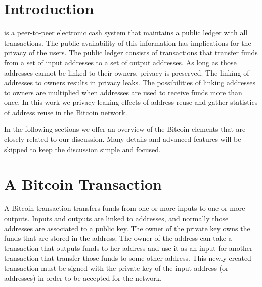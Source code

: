 \documentclass[journal]{IEEEtran}
\begin{document}
\section{Introduction}
%
%
%
%



 is a peer-to-peer electronic cash system \cite{nakamoto2008bpp} that maintains a public ledger with all transactions.
The public availability of this information has implications for the privacy of the users.
The public ledger consists of transactions that transfer funds from a set of input addresses to a set of output addresses.
As long as those addresses cannot be linked to their owners, privacy is preserved.
The linking of addresses to owners results in privacy leaks.
The possibilities of linking addresses to owners are multiplied when addresses are used to receive funds more than once.
In this work we privacy-leaking effects of address reuse and gather statistics of address reuse in the Bitcoin network.

In the following sections we offer an overview of the Bitcoin elements that are closely related to our discussion.
Many details and advanced features will be skipped to keep the discussion simple and focused.

\section{A Bitcoin Transaction}
A Bitcoin transaction transfers funds from one or more inputs to one or more outputs.
Inputs and outputs are linked to addresses, and normally those addresses are associated to a public key.
The owner of the private key owns the funds that are stored in the address.
The owner of the address can take a transaction that outputs funds to her address and use it as an input for another transaction that transfer those funds to some other address.
This newly created transaction must be signed with the private key of the input address (or addresses) in order to be accepted for the network.
\end{document}
